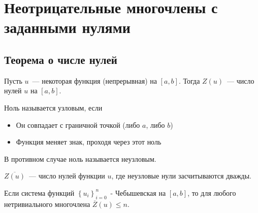 \section{Неотрицательные многочлены с заданными нулями}
\subsection{Теорема о числе нулей}
\begin{dfn}
Пусть $u$ — некоторая функция (непрерывная) на $[a,b]$. Тогда $Z(u)$ — число нулей $u$ на $[a,b]$.
\end{dfn}
\begin{dfn}
Ноль называется узловым, если 
\begin{itemize}
\item Он совпадает с граничной точкой (либо $a$, либо $b$)
\item Функция меняет знак, проходя через этот ноль
\end{itemize}
В противном случае ноль называется неузловым.
\end{dfn}

\begin{dfn}
$\overline{Z(u)}$ — число нулей функции $u$, где неузловые нули засчитываются дважды.
\end{dfn}

\begin{thm}
\label{zeroThm}
Если система функций $\left\{ u_i\right\}_{i=0}^{n}$ - Чебышевская на $[a,b]$,  то для любого нетривиального многочлена $\overline{Z}(u) \leq n$.
\end{thm}

